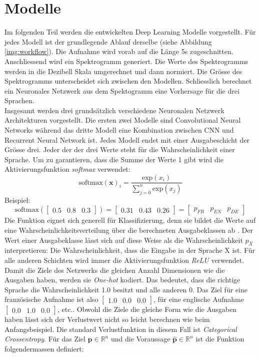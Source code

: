           \section{Modelle}
Im folgenden Teil werden die entwickelten Deep Learning Modelle vorgestellt. Für jedes Modell ist der grundlegende Ablauf derselbe (siehe Abbildung \ref{img:workflow}). Die Aufnahme wird vorab auf die Länge 5s zugeschnitten. Anschliessend wird ein Spektrogramm generiert. Die Werte des Spektrogramms werden in die Dezibell Skala umgerechnet und dann normiert. Die Grösse des Spektrogramms unterscheidet sich zwischen den Modellen. Schliesslich berechnet ein Neuronales Netzwerk aus dem Spektogramm eine Vorhersage für die drei Sprachen. 
\\
Insgesamt werden drei grundsätzlich verschiedene Neuronalen Netzwerk Architekturen vorgestellt. Die ersten zwei Modelle sind Convolutional Neural Networks während das dritte Modell eine Kombination zwischen CNN und Recurrent Neural Network ist. Jedes Modell endet mit einer Ausgabeschicht der Grösse drei. Jeder der der drei Werte steht für die Wahrscheinlichkeit einer Sprache. Um zu garantieren, dass die Summe der Werte 1 gibt wird die Aktivierungsfunktion \textit{softmax} verwendet:
$$ \text{softmax}(\boldsymbol x)_i = \frac{\text{exp}(x_i)}{\sum_{j=0}^{n} \text{exp}(x_j)}$$
Beispiel: 
$$ \text{softmax}(\begin{bmatrix} 0.5 & 0.8 & 0.3\end{bmatrix}) = \begin{bmatrix} 0.31 & 0.43 & 0.26\end{bmatrix} = \begin{bmatrix} p_{FR} & p_{EN} & p_{DE}\end{bmatrix}$$
Die Funktion eignet sich generell für Klassifizierung, denn sie bildet die Werte auf eine Wahrscheinlichkeitsverteilung über die berechneten Ausgabeklassen ab \parencite[][S. 180-184]{goodfellow}. Der Wert einer Ausgabeklasse lässt sich auf diese Weise als die Wahrscheinlichkeit $p_{X}$ interpretieren: Die Wahrscheinlichkeit, dass die Eingabe in der Sprache X ist. Für alle anderen Schichten wird immer die Aktivierungsfunktion \textit{ReLU} verwendet.
\\
Damit die Ziele des Netzwerks die gleichen Anzahl Dimensionen wie die Ausgaben haben, werden sie \textit{One-hot}\parencite{chollet} kodiert. Das bedeutet, dass die richtige Sprache die Wahrscheinlichkeit 1.0 besitzt und alle anderen 0. Das Ziel für eine französische Aufnahme ist also $\begin{bmatrix} 1.0 & 0.0 & 0.0\end{bmatrix}$, für eine englische Aufnahme $\begin{bmatrix} 0.0 & 1.0 & 0.0\end{bmatrix}$, etc.. Obwohl die Ziele die gleiche Form wie die Ausgaben haben lässt sich der Verlustwert nicht so leicht berechnen wie beim Anfangsbeispiel. Die standard Verlustfunktion in diesem Fall ist \textit{Categorical Crossentropy}\parencite{chollet}. Für das Ziel $\boldsymbol{p} \in \mathbb{R}^n$ und die Voraussage $\boldsymbol{\hat{p}} \in \mathbb{R}^n$ ist die Funktion folgendermassen definiert:

